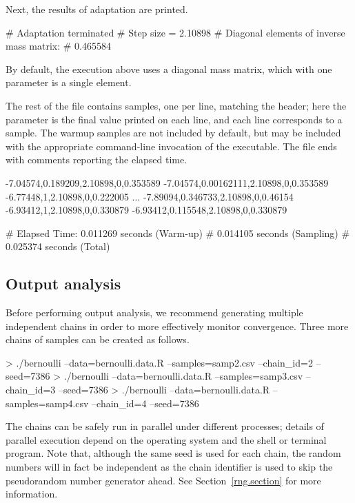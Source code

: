 \documentclass[article]{jss}
\begin{document}
Next, the results of adaptation are printed.
%
\begin{Code}
# Adaptation terminated
# Step size = 2.10898
# Diagonal elements of inverse mass matrix:
# 0.465584
\end{Code}
%
By default, the execution above uses a diagonal mass matrix, which
with one parameter is a single element.

The rest of the file contains samples, one per line, matching the
header; here the parameter  is the final value printed on
each line, and each line corresponds to a sample.  The warmup samples
are not included by default, but may be included with the appropriate
command-line invocation of the executable. The file ends with comments reporting the elapsed time.
%
\begin{Code}
-7.04574,0.189209,2.10898,0,0.353589
-7.04574,0.00162111,2.10898,0,0.353589
-6.77448,1,2.10898,0,0.222005
...
-7.89094,0.346733,2.10898,0,0.46154
-6.93412,1,2.10898,0,0.330879
-6.93412,0.115548,2.10898,0,0.330879

# Elapsed Time: 0.011269 seconds (Warm-up)
#               0.014105 seconds (Sampling)
#               0.025374 seconds (Total)
\end{Code}
%

\subsection{Output analysis}

Before performing output analysis, we recommend generating multiple
independent chains in order to more effectively monitor convergence.
Three more chains of samples can be created as follows.
%
\begin{CodeChunk}
{\small
\begin{CodeInput}
> ./bernoulli --data=bernoulli.data.R --samples=samp2.csv --chain_id=2 --seed=7386
> ./bernoulli --data=bernoulli.data.R --samples=samp3.csv --chain_id=3 --seed=7386
> ./bernoulli --data=bernoulli.data.R --samples=samp4.csv --chain_id=4 --seed=7386
\end{CodeInput}
}
\end{CodeChunk}
%
The chains can be safely run in parallel under different processes;
details of parallel execution depend on the operating system and the shell or
terminal program. Note that, although the same seed is used for each chain, the
random numbers will in fact be independent as the chain identifier
is used to skip the pseudorandom number generator ahead.  See
Section~\ref{rng.section} for more information.
\end{document}
